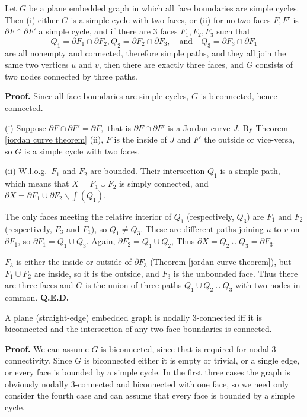 \begin{lemma}
\label{2 or 3 faces} Let $G$ be a plane embedded graph in which all face
boundaries are simple cycles.  Then
{\rm (i)} either $G$ is a simple cycle with two faces, or\hfil\break
{\rm (ii)} for no two faces $F,F'$ is $\partial F \cap \partial F'$ a simple
cycle, and
if there are 3 faces $F_1,F_2,F_3$ such that
$$
Q_1 = \partial F_1 \cap \partial F_2,
Q_2 = \partial F_2 \cap \partial F_3, \quad\text{and}\quad
Q_3 = \partial F_3 \cap \partial F_1
$$ are all nonempty and connected, therefore simple paths, and they all
join the same two vertices $u$ and $v$,
then there are exactly three faces, and
$G$ consists of two nodes connected by three paths.
\end{lemma}

{\bf Proof.} Since all face boundaries are simple cycles,
$G$ is biconnected, hence connected.

(i) Suppose
$\partial F \cap \partial F' = \partial F,$  that
is $\partial F \cap \partial F'$ is a Jordan curve $J$.
By Theorem \ref{jordan curve theorem} (ii),
$F$ is the inside of $J$ and $F'$ the outside
or vice-versa, so $G$ is a simple cycle with two faces.

(ii)  W.l.o.g.\  $F_1$ and $F_2$ are bounded.  Their
intersection $Q_1$ is a simple path, which means that
$X=\overline{F_1}\cup \overline{F_2}$ is simply connected,
and $\partial X = \partial F_1 \cup \partial F_2 \backslash
\int( Q_1)$.

The only faces meeting the relative interior of $Q_1$ (respectively, $Q_3$) are
$F_1$ and $F_2$ (respectively, $F_3$ and $F_1$), so $Q_1 \not= Q_3$.
These are different paths joining $u$ to $v$ on $\partial F_1$,
so $\partial F_1 = Q_1\cup Q_3$. Again, $\partial F_2 = Q_1 \cup Q_2$,
Thus $\partial X = Q_2 \cup Q_3 = \partial F_3$.

$F_3$ is either the inside or outside of $\partial F_3$
(Theorem \ref{jordan curve theorem}), but $F_1\cup F_2$
are inside, so it is the outside, and $F_3$ is the
unbounded face.  Thus there are three faces and
$G$ is the union of three paths $Q_1\cup Q_2\cup Q_3$
with two nodes in common.
{\bf Q.E.D.}\medskip

\begin{theorem}
\label{planar nodally 3-connected} A plane (straight-edge)
embedded graph is nodally 3-connected iff it is biconnected and
the intersection of any two face boundaries is connected.
\end{theorem}

{\bf Proof.} We can assume $G$ is biconnected,
since that is required for nodal 3-connectivity.
Since $G$ is biconnected either it is empty or
trivial, or a single edge, or
every face is bounded by a simple cycle.
In the first three cases the graph is obviously
nodally 3-connected and
biconnected with one face, so we need
only consider the fourth case and can assume that every face is bounded by
a simple cycle.

